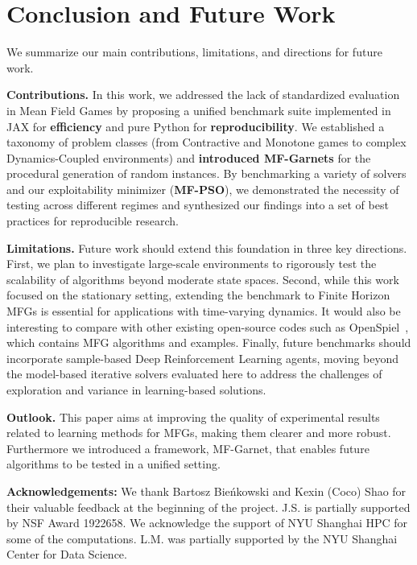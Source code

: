 \documentclass[10pt,twocolumn,letterpaper]{article}
\theoremstyle{definition}
\theoremstyle{remark}
\begin{document}
\section{Conclusion and Future Work}
We summarize our main contributions, limitations, and directions for future work.

\textbf{Contributions.} In this work, we addressed the lack of standardized evaluation in Mean Field Games by proposing a unified benchmark suite implemented in JAX for \textbf{efficiency} and pure Python for \textbf{reproducibility}. We established a taxonomy of problem classes (from Contractive and Monotone games to complex Dynamics-Coupled environments) and \textbf{introduced MF-Garnets} for the procedural generation of random instances. By benchmarking a variety of solvers and our exploitability minimizer (\textbf{MF-PSO}), we demonstrated the necessity of testing across different regimes and synthesized our findings into a set of best practices for reproducible research. 


\textbf{Limitations.} Future work should extend this foundation in three key directions. First, we plan to investigate large-scale environments to rigorously test the scalability of algorithms beyond moderate state spaces. Second, while this work focused on the stationary setting, extending the benchmark to Finite Horizon MFGs is essential for applications with time-varying dynamics. It would also be interesting to compare with other existing open-source codes such as OpenSpiel~\citep{lanctot2019openspiel}, which contains MFG algorithms and examples. Finally, future benchmarks should incorporate sample-based Deep Reinforcement Learning agents, moving beyond the model-based iterative solvers evaluated here to address the challenges of exploration and variance in learning-based solutions.


\textbf{Outlook.} This paper aims at improving the quality of experimental results related to learning methods for MFGs, making them clearer and more robust. Furthermore we introduced a framework, MF-Garnet, that enables future algorithms to be tested in a unified setting. 



\noindent\textbf{Acknowledgements:} We thank Bartosz Bieńkowski and Kexin (Coco) Shao for their valuable feedback at the beginning of the project. J.S. is partially supported by NSF Award 1922658. We acknowledge the support of NYU Shanghai HPC for some of the computations. L.M. was partially supported by the NYU Shanghai Center for Data Science.
\end{document}
